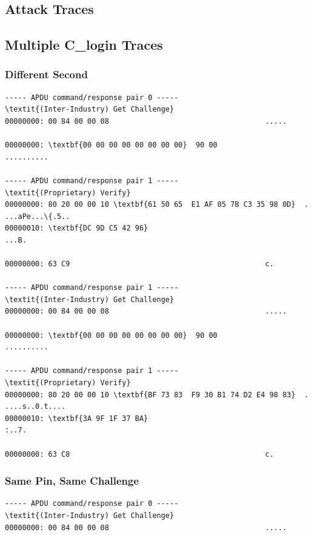 \documentclass[bsc,frontabs,twoside,singlespacing,parskip,deptreport]{infthesis}     %
\begin{document}
\begin{appendices}
\chapter{Attack Traces}

\section{Multiple C\_login Traces}
\subsection{Different Second}
\begin{Verbatim}[commandchars=\\\{\}, fontsize=\small]
----- APDU command/response pair 0 -----
\textit{(Inter-Industry) Get Challenge}
00000000: 00 84 00 00 08                                    .....

00000000: \textbf{00 00 00 00 00 00 00 00}  90 00                    ..........

----- APDU command/response pair 1 -----
\textit{(Proprietary) Verify}
00000000: 80 20 00 00 10 \textbf{61 50 65  E1 AF 05 7B C3 35 98 0D}  . ...aPe...\{.5..
00000010: \textbf{DC 9D C5 42 96}                                    ...B.

00000000: 63 C9                                             c.

----- APDU command/response pair 1 -----
\textit{(Inter-Industry) Get Challenge}
00000000: 00 84 00 00 08                                    .....

00000000: \textbf{00 00 00 00 00 00 00 00}  90 00                    ..........

----- APDU command/response pair 1 -----
\textit{(Proprietary) Verify}
00000000: 80 20 00 00 10 \textbf{BF 73 83  F9 30 B1 74 D2 E4 98 83}  . ....s..0.t....
00000010: \textbf{3A 9F 1F 37 BA}                                    :..7.

00000000: 63 C8                                             c.
\end{Verbatim}
\subsection{Same Pin, Same Challenge}
\begin{Verbatim}[commandchars=\\\{\}, fontsize=\small]
----- APDU command/response pair 0 -----
\textit{(Inter-Industry) Get Challenge}
00000000: 00 84 00 00 08                                    .....


\end{Verbatim}
\end{appendices}
\end{document}
